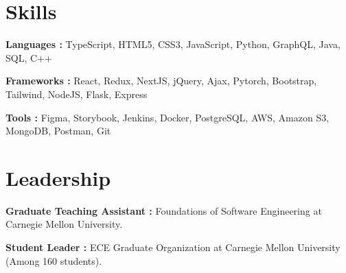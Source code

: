 \documentclass[letterpaper]{article}
\makeatletter
\newcommand{\resumeItemWithoutTitle}[1]{
  \item{
    {#1 \vspace{-4pt}}
  }
}
\newcommand{\shortSection}[1]{
    \vspace{-6pt}
    \section{#1}
}
\newcommand{\projectHeading}[4]{
  \begin{tabular*}{\textwidth}{l@{\extracolsep{\fill}}r}
        \textbf{#1} 
        \hspace{-2pt} $\vert$ \hspace{-2pt} {\textit{\textbf{#2}}} 
        \hspace{-2pt} $\vert$ \hspace{-2pt} \href{#3}{ \underline{Link}}
        & 
        \textit{#4} \\
    \end{tabular*}\vspace{-2pt}
}
\newcommand{\projectHeadingWithoutLink}[3]{
  \begin{tabular*}{\textwidth}{l@{\extracolsep{\fill}}r}
        \textbf{#1} 
        \hspace{-2pt} $\vert$ \hspace{-2pt} {\textit{\textbf{#2}}}
        & 
        \textit{#3} \\
    \end{tabular*}\vspace{-2pt}
}
\newcommand*{\skill}[2]{
  \textbf{#1 : }#2 \\
  \vspace{1pt}
}
\newcommand{\resumeItemListStart}{\begin{itemize}}
\newcommand{\resumeItemListEnd}{\end{itemize}}
\makeatother
\begin{document}







\shortSection{Skills}
\skill {Languages \hspace{4pt}}{TypeScript, HTML5, CSS3, JavaScript, Python, GraphQL, Java, SQL, C++}
\skill {Frameworks}{React, Redux, NextJS, jQuery, Ajax, Pytorch, Bootstrap, Tailwind, NodeJS, Flask, Express}
\skill {Tools \hspace{30pt}}{Figma, Storybook, Jenkins, Docker, PostgreSQL, AWS, Amazon S3, MongoDB, Postman, Git}



\shortSection{Leadership}
\skill{Graduate Teaching Assistant}{Foundations of Software Engineering at Carnegie Mellon University.}
\skill{Student Leader}{ECE Graduate Organization at Carnegie Mellon University (Among 160 students).}
\end{document}
